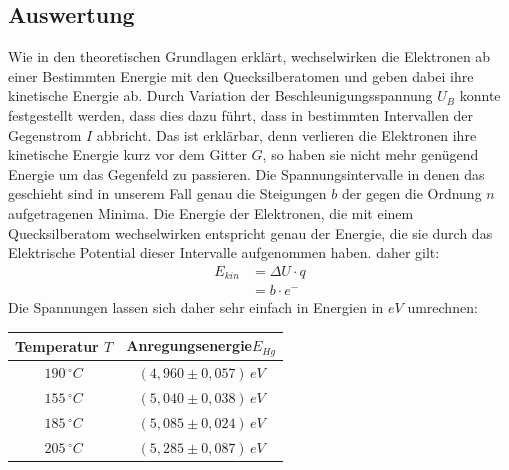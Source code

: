 \subsection{Auswertung}
Wie in den theoretischen Grundlagen erklärt, wechselwirken die Elektronen ab einer Bestimmten Energie mit den Quecksilberatomen und geben dabei ihre kinetische Energie ab. Durch Variation der Beschleunigungsspannung \(U_B\) konnte festgestellt werden, dass dies dazu führt, dass in bestimmten Intervallen der Gegenstrom \(I\) abbricht. Das ist erklärbar, denn verlieren die Elektronen ihre kinetische Energie kurz vor dem Gitter \(G\), so haben sie nicht mehr genügend Energie um das Gegenfeld zu passieren. Die Spannungsintervalle in denen das geschieht sind in unserem Fall genau die Steigungen \(b\) der gegen die Ordnung \(n\) aufgetragenen Minima. Die Energie der Elektronen, die mit einem Quecksilberatom wechselwirken entspricht genau der Energie, die sie durch das Elektrische Potential dieser Intervalle aufgenommen haben. daher gilt:
\begin{align}
E_{kin} &= \Delta U \cdot q \\
&= b \cdot e^-  \label{E_kin}
\end{align}
Die Spannungen lassen sich daher sehr einfach in Energien in \(eV\) umrechnen:
\begin{center}
\begin{tabular}{c|c}
Temperatur \(T\) & Anregungsenergie\(E_{Hg}\)\\\hline
\(190\, ^\circ C\) & \(\left( 4,960 \pm 0,057 \right) \, eV\) \\
\(155\, ^\circ C\) & \(\left( 5,040 \pm 0,038 \right) \, eV\) \\
\(185\, ^\circ C\) & \(\left( 5,085 \pm 0,024 \right) \, eV\) \\
\(205\, ^\circ C\) & \(\left( 5,285 \pm 0,087 \right) \, eV\) \\
\end{tabular}
\end{center}
